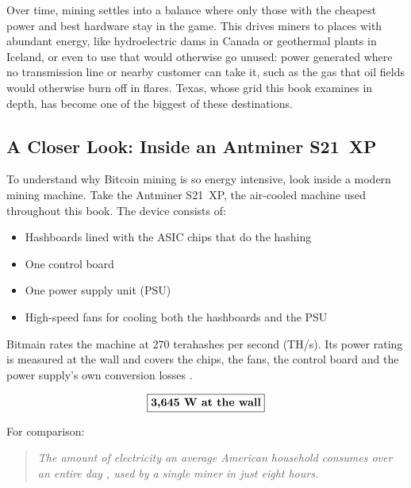 Over time, mining settles into a balance where only those with the cheapest power and best hardware stay in the game. This drives miners to places with abundant energy, like hydroelectric dams in Canada or geothermal plants in Iceland, or even to use  that would otherwise go unused: power generated where no transmission line or nearby customer can take it, such as the gas that oil fields would otherwise burn off in flares. Texas, whose grid this book examines in depth, has become one of the biggest of these destinations.

\subsection*{A Closer Look: Inside an Antminer S21~XP}

To understand why Bitcoin mining is so energy intensive, look inside a modern mining machine. Take the Antminer S21~XP, the air-cooled machine used throughout this book.
The device consists of:

\begin{itemize}
\item Hashboards lined with the ASIC chips that do the hashing
\item One control board
\item One power supply unit (PSU)
\item High-speed fans for cooling both the hashboards and the PSU
\end{itemize}

Bitmain rates the machine at 270 terahashes per second (TH/s). Its power rating is measured at the wall and covers the chips, the fans, the control board and the power supply's own conversion losses \autocite{bitmain2024s21xp,braiinsacademytechres}. %

\[
\fbox{\textbf{3{,}645~W at the wall}}
\]

For comparison:
\begin{quote}
\textit{The amount of electricity an average American household consumes over an entire day \autocite{EIAHouseholdConsumption2022}, used by a single miner in just eight hours.} %
\end{quote}

